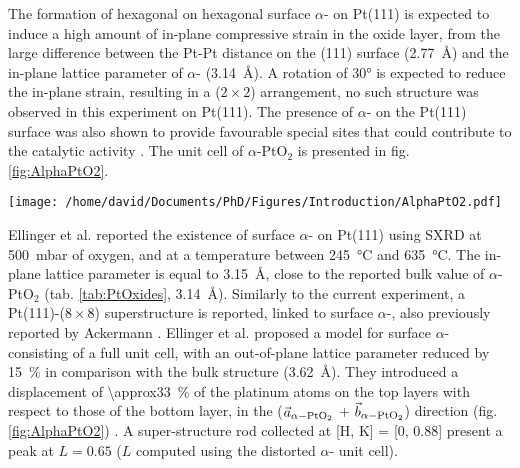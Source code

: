 The formation of hexagonal on hexagonal surface $\alpha$- on Pt(111) is expected to induce a high amount of in-plane compressive strain in the oxide layer, from the large difference between the Pt-Pt distance on the (111) surface (\qty{2.77}{\angstrom}) and the in-plane lattice parameter of $\alpha$- (\qty{3.14}{\angstrom}).
A rotation of \ang{30} is expected to reduce the in-plane strain, resulting in a ($2\times2$) arrangement, no such structure was observed in this experiment on Pt(111).
The presence of $\alpha$- on the Pt(111) surface was also shown to provide favourable special sites that could contribute to the catalytic activity \parencite{Li2005}.
The unit cell of $\alpha$-PtO$_2$ is presented in fig. \ref{fig:AlphaPtO2}.

\begin{SCfigure}
    \centering
    \texttt{[image: /home/david/Documents/PhD/Figures/Introduction/AlphaPtO2.pdf]}
    \caption{
        $\alpha$- bulk unit cell.
        Platinum atoms are situated on the unit cell corners (blue) while the two oxygen atoms are at the positions $(1/3, 2/3, 1/4)$ and $(2/3, 1/3, 3/4)$ (orange).
    }
    \label{fig:AlphaPtO2}
\end{SCfigure}

Ellinger et al. \parencite*{Ellinger2008} reported the existence of surface $\alpha$- on Pt(111) using SXRD at \qty{500}{\milli\bar} of oxygen, and at a temperature between \qty{245}{\degreeCelsius} and \qty{635}{\degreeCelsius}.
The in-plane lattice parameter is equal to \qty{3.15}{\angstrom}, close to the reported bulk value of $\alpha$-PtO$_2$ (tab. \ref{tab:PtOxides}, \qty{3.14}{\angstrom}).
Similarly to the current experiment, a Pt(111)-($8\times8$) superstructure is reported, linked to surface $\alpha$-,  also previously reported by Ackermann \parencite*{Ackermann2007}.
Ellinger et al. \parencite*{Ellinger2008} proposed a model for surface $\alpha$- consisting of a full unit cell, with an out-of-plane lattice parameter reduced by \qty{15}{\percent} in comparison with the bulk structure (\qty{3.62}{\angstrom}).
They introduced a displacement of \qty{\approx33}{\percent} of the platinum atoms on the top layers with respect to those of the bottom layer, in the ($\vec{a}_{\alpha-\ce{PtO_2}}$ + $\vec{b}_{\alpha-\ce{PtO_2}}$) direction (fig. \ref{fig:AlphaPtO2}) .
A super-structure rod collected at [H, K] = [0, 0.88] present a peak at $L=0.65$ ($L$ computed using the distorted $\alpha$- unit cell).

